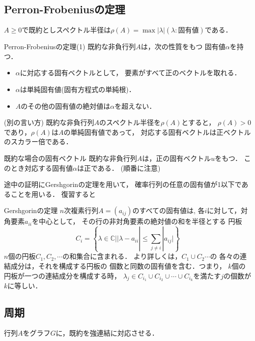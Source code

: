 \subsection{Perron-Frobeniusの定理}
$A\geq 0$で既約としスペクトル半径は$\rho (A)=\max |\lambda |(\lambda :固有値)$である．
\begin{itembox}[l]{Perron-Frobeniusの定理(1)}
既約な非負行列$A$は，次の性質をもつ
固有値$\alpha$を持つ．
  \begin{itemize}
    \item $\alpha$に対応する固有ベクトルとして，
    要素がすべて正のベクトルを取れる．
    \item $\alpha$は単純固有値(固有方程式の単純根)．
    \item $A$のその他の固有値の絶対値は$\alpha$を超えない．
  \end{itemize}
  (別の言い方)
  既約な非負行列$A$のスペクトル半径を$\rho(A)$とすると，
  $\rho(A) >0$であり，$\rho(A)$は$A$の単純固有値であって，
  対応する固有ベクトルは正ベクトルのスカラー倍である．
\end{itembox}
\begin{itembox}[l]{既約な場合の固有ベクトル}
既約な非負行列$A$は，正の固有ベクトル$u$をもつ．
このとき対応する固有値$\alpha$は正である．
(順番に注意)
\end{itembox}
途中の証明にGershgorinの定理を用いて，
確率行列の任意の固有値が1以下であることを用いる．
復習すると
\begin{itembox}[l]{Gershgorinの定理}
$n$次複素行列$A=(a_{ij})$のすべての固有値は,
各$i$に対して，対角要素$a_{ii}$を中心として，
その行の非対角要素の絶対値の和を半径とする
円板
\begin{equation}
    C_i = \left\{\lambda \in \mathbb{C}| |\lambda - a_{ii}| \leq 
    \sum_{j\neq i} |a_{ij}|
    \right \}
\end{equation}
$n$個の円板$C_1,C_2,\cdots$の和集合に含まれる．
より詳しくは，$C_1 \cup C_2 \cdots$の
各々の連結成分は，それを構成する円板の
個数と同数の固有値を含む．つまり，
$k$個の円板が一つの連結成分を構成する時，
$\lambda_j \in C_{i_1}\cup C_{i_2} \cup \cdots \cup
C_{i_k}$を満たす$j$の個数が$k$に等しい．
\end{itembox}
\subsection{周期}
行列$A$をグラフ$G$に，既約を強連結に対応させる．

